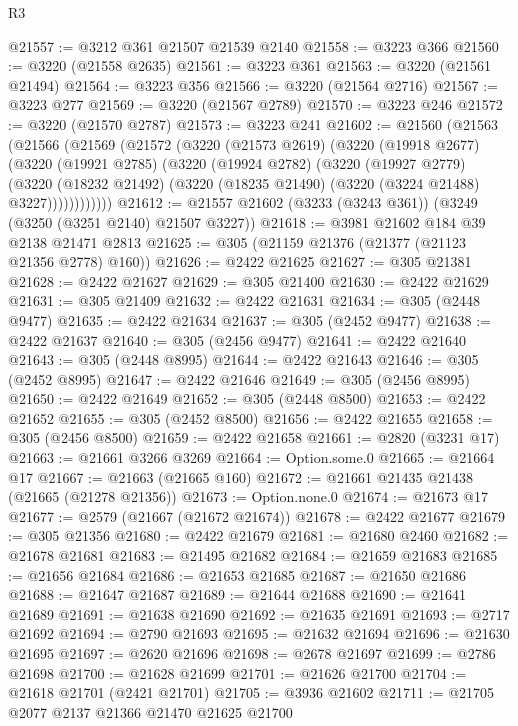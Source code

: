 \begin{lexlean}{R3}
\begin{coremodule}
@21557 := @3212 @361 @21507 @21539 @2140
@21558 := @3223 @366
@21560 := @3220 (@21558 @2635)
@21561 := @3223 @361
@21563 := @3220 (@21561 @21494)
@21564 := @3223 @356
@21566 := @3220 (@21564 @2716)
@21567 := @3223 @277
@21569 := @3220 (@21567 @2789)
@21570 := @3223 @246
@21572 := @3220 (@21570 @2787)
@21573 := @3223 @241
@21602 := @21560
    (@21563
      (@21566
        (@21569
          (@21572
            (@3220
              (@21573 @2619)
              (@3220
                (@19918 @2677)
                (@3220
                  (@19921 @2785)
                  (@3220
                    (@19924 @2782)
                    (@3220
                      (@19927 @2779)
                      (@3220
                        (@18232 @21492)
                        (@3220 (@18235 @21490) (@3220 (@3224 @21488) @3227))))))))))))
@21612 := @21557 @21602 (@3233 (@3243 @361)) (@3249 (@3250 (@3251 @2140) @21507 @3227))
@21618 := @3981 @21602 @184 @39 @2138 @21471 @2813
@21625 := @305 (@21159 @21376 (@21377 (@21123 @21356 @2778) @160))
@21626 := @2422 @21625
@21627 := @305 @21381
@21628 := @2422 @21627
@21629 := @305 @21400
@21630 := @2422 @21629
@21631 := @305 @21409
@21632 := @2422 @21631
@21634 := @305 (@2448 @9477)
@21635 := @2422 @21634
@21637 := @305 (@2452 @9477)
@21638 := @2422 @21637
@21640 := @305 (@2456 @9477)
@21641 := @2422 @21640
@21643 := @305 (@2448 @8995)
@21644 := @2422 @21643
@21646 := @305 (@2452 @8995)
@21647 := @2422 @21646
@21649 := @305 (@2456 @8995)
@21650 := @2422 @21649
@21652 := @305 (@2448 @8500)
@21653 := @2422 @21652
@21655 := @305 (@2452 @8500)
@21656 := @2422 @21655
@21658 := @305 (@2456 @8500)
@21659 := @2422 @21658
@21661 := @2820 (@3231 @17)
@21663 := @21661 @3266 @3269
@21664 := Option.some.{0}
@21665 := @21664 @17
@21667 := @21663 (@21665 @160)
@21672 := @21661 @21435 @21438 (@21665 (@21278 @21356))
@21673 := Option.none.{0}
@21674 := @21673 @17
@21677 := @2579 (@21667 (@21672 @21674))
@21678 := @2422 @21677
@21679 := @305 @21356
@21680 := @2422 @21679
@21681 := @21680 @2460
@21682 := @21678 @21681
@21683 := @21495 @21682
@21684 := @21659 @21683
@21685 := @21656 @21684
@21686 := @21653 @21685
@21687 := @21650 @21686
@21688 := @21647 @21687
@21689 := @21644 @21688
@21690 := @21641 @21689
@21691 := @21638 @21690
@21692 := @21635 @21691
@21693 := @2717 @21692
@21694 := @2790 @21693
@21695 := @21632 @21694
@21696 := @21630 @21695
@21697 := @2620 @21696
@21698 := @2678 @21697
@21699 := @2786 @21698
@21700 := @21628 @21699
@21701 := @21626 @21700
@21704 := @21618 @21701 (@2421 @21701)
@21705 := @3936 @21602
@21711 := @21705 @2077 @2137 @21366 @21470 @21625 @21700

\end{coremodule}
\end{lexlean}
